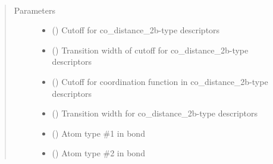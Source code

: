 \documentclass[letterpaper,10pt,english]{sphinxmanual}
\begin{document}

\begin{fulllineitems}
\label{\detokenize{descriptors:gap.descriptors.co_distance_2b}}~\begin{quote}\begin{description}
\item[{Parameters}] \leavevmode\begin{itemize}
\item {} 
 () \textendash{} Cutoff for co\_distance\_2b-type descriptors

\item {} 
 () \textendash{} Transition width of cutoff for co\_distance\_2b-type descriptors

\item {} 
 () \textendash{} Cutoff for coordination function in co\_distance\_2b-type descriptors

\item {} 
 () \textendash{} Transition width for co\_distance\_2b-type descriptors

\item {} 
 () \textendash{} Atom type \#1 in bond

\item {} 
 () \textendash{} Atom type \#2 in bond

\end{itemize}

\end{description}\end{quote}

\end{fulllineitems}
\end{document}
